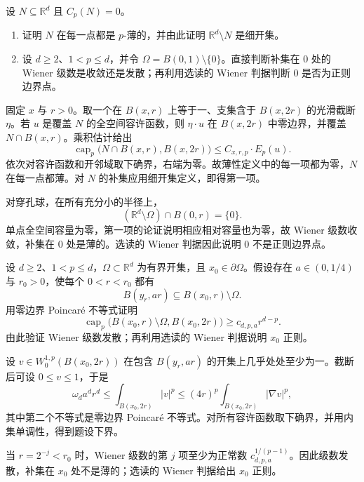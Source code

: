 \begin{optionalexercise}\label{b1:ex:26-zero-capacity-thinness}
设 \(N\subseteq\mathbb R^d\) 且 \(C_p(N)=0\)。
\begin{enumerate}
 \item 证明 \(N\) 在每一点都是 \(p\)-薄的，并由此证明 \(\mathbb R^d\setminus N\) 是细开集。
 \item 设 \(d\ge2\)、\(1<p\le d\)，并令
 \(\Omega=B(0,1)\setminus\{0\}\)。直接判断补集在 \(0\) 处的 Wiener 级数是收敛还是发散；再利用选读的 Wiener 判据判断 \(0\) 是否为正则边界点。
\end{enumerate}
\end{optionalexercise}
\begin{solution}
固定 \(x\) 与 \(r>0\)。取一个在 \(B(x,r)\) 上等于一、支集含于 \(B(x,2r)\) 的光滑截断 \(\eta\)。若 \(u\) 是覆盖 \(N\) 的全空间容许函数，则 \(\eta\cdot u\) 在 \(B(x,2r)\) 中零边界，并覆盖 \(N\cap B(x,r)\)。乘积估计给出
\[
 \operatorname{cap}_p\bigl(N\cap B(x,r),B(x,2r)\bigr)
 \le C_{x,r,p}\cdot E_p(u).
\]
依次对容许函数和开邻域取下确界，右端为零。故薄性定义中的每一项都为零，\(N\) 在每一点都薄。对 \(N\) 的补集应用细开集定义，即得第一项。

对穿孔球，在所有充分小的半径上，
\[
 (\mathbb R^d\setminus\Omega)\cap B(0,r)=\{0\}.
\]
单点全空间容量为零，第一项的论证说明相应相对容量也为零，故 Wiener 级数收敛，补集在 \(0\) 处是薄的。选读的 Wiener 判据因此说明 \(0\) 不是正则边界点。
\end{solution}

\begin{optionalexercise}\label{b1:ex:26-exterior-corkscrew-wiener}
设 \(d\ge2\)、\(1<p\le d\)，\(\Omega\subset\mathbb R^d\) 为有界开集，且 \(x_0\in\partial\Omega\)。假设存在 \(a\in(0,1/4)\) 与 \(r_0>0\)，使每个 \(0<r<r_0\) 都有
\[
 B(y_r,ar)\subseteq B(x_0,r)\setminus\Omega.
\]
用零边界 Poincaré 不等式证明
\[
 \operatorname{cap}_p\bigl(B(x_0,r)\setminus\Omega,B(x_0,2r)\bigr)
 \ge c_{d,p,a}r^{d-p}.
\]
由此验证 Wiener 级数发散；再利用选读的 Wiener 判据说明 \(x_0\) 正则。
\end{optionalexercise}
\begin{solution}
设 \(v\in W_0^{1,p}(B(x_0,2r))\) 在包含 \(B(y_r,ar)\) 的开集上几乎处处至少为一。截断后可设 \(0\le v\le1\)，于是
\[
 \omega_d a^dr^d
 \le\int_{B(x_0,2r)}|v|^p
 \le (4r)^p\int_{B(x_0,2r)}|\nabla v|^p,
\]
其中第二个不等式是零边界 Poincaré 不等式。对所有容许函数取下确界，并用内集单调性，得到题设下界。

当 \(r=2^{-j}<r_0\) 时，Wiener 级数的第 \(j\) 项至少为正常数
\(c_{d,p,a}^{1/(p-1)}\)。因此级数发散，补集在 \(x_0\) 处不是薄的；选读的 Wiener 判据给出 \(x_0\) 正则。
\end{solution}

